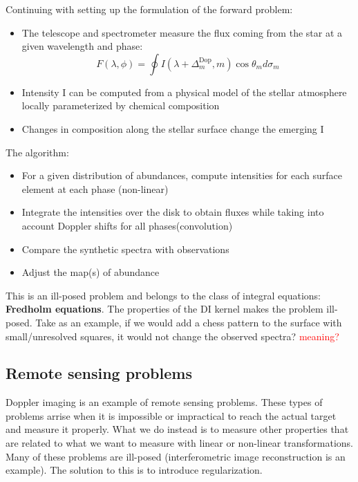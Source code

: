 	Continuing with setting up the formulation of the forward problem:
		
		\begin{itemize}
			\item The telescope and spectrometer measure the flux coming from the star at a given wavelength and phase: 
			\begin{equation}
			 	F(\lambda, \phi) = \oint I(\lambda + \Delta^{\text{Dop}}_m,m)\cos \theta_m d \sigma_m
			 \end{equation} 
			 \item Intensity I can be computed from a physical model of the stellar atmosphere locally parameterized by chemical composition
			 \item Changes in composition along the stellar surface change the emerging I
		\end{itemize}

	The algorithm: 

		\begin{itemize}
			\item For a given distribution of abundances, compute intensities for each surface element at each phase (non-linear)
			\item Integrate the intensities over the disk to obtain fluxes while taking into account Doppler shifts for all phases(convolution)
			\item Compare the synthetic spectra with observations
			\item Adjust the map(s) of abundance 
		\end{itemize}

	This is an ill-posed problem and belongs to the class of integral equations: \textbf{Fredholm equations}. The properties of the DI kernel makes the problem ill-posed. Take as an example, if we would add a chess pattern to the surface with small/unresolved squares, it would not change the observed spectra? \textcolor{red}{meaning?}

	\subsection*{Remote sensing problems}
	Doppler imaging is an example of remote sensing problems. These types of problems arrise when it is impossible or impractical to reach the actual target and measure it properly. What we do instead is to measure other properties that are related to what we want to measure with linear or non-linear transformations. Many of these problems are ill-posed (interferometric image reconstruction is an example). The solution to this is to introduce regularization.

